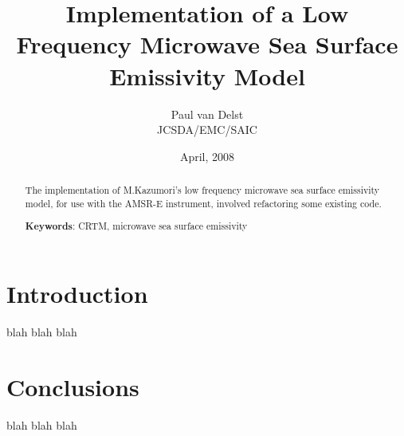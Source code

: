 




\newcommand{\rb}[1]{\raisebox{1.5ex}[0pt]{#1}}
\newcommand{\po}{\ensuremath{p_{0}}}
\newcommand{\bpo}{\boldmath\po\unboldmath}
\newcommand{\Dp}{\ensuremath{\Delta p}}
\newcommand{\bDp}{\boldmath\Dp\unboldmath}
\newcommand{\reff}{\ensuremath{R_{eff}}}
\newcommand{\breff}{\boldmath\reff\unboldmath}
\newcommand{\bhpa}{\textbf{(hPa)}}
\newcommand{\bmicron}{\boldmath\micron\unboldmath}

\title{Implementation of a Low Frequency Microwave Sea Surface Emissivity Model}
\author{Paul van Delst\\JCSDA/EMC/SAIC}
\date{April, 2008}



\maketitle

\draftwatermark

\begin{abstract}
The implementation of M.Kazumori's low frequency microwave sea surface emissivity model, for use with the AMSR-E instrument, involved refactoring some existing code.

\textbf{Keywords}: CRTM, microwave sea surface emissivity
\end{abstract}


\section{Introduction}
blah blah blah






\section{Conclusions}
blah blah blah
\cite{Guillou_etal_1998}


	


\begin{appendix}
  
\end{appendix}




